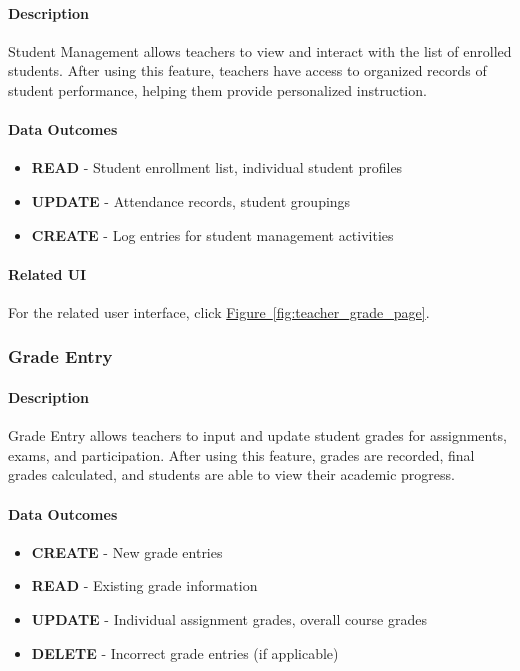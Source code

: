 \documentclass[12pt]{article}
\begin{document}
\paragraph{Description}
Student Management allows teachers to view and interact with the list of enrolled students. After using this feature, teachers have access to organized records of student performance, helping them provide personalized instruction.

\paragraph{Data Outcomes}
\begin{itemize}
    \item \textbf{READ} - Student enrollment list, individual student profiles
    \item \textbf{UPDATE} - Attendance records, student groupings
    \item \textbf{CREATE} - Log entries for student management activities
\end{itemize}

\paragraph{Related UI}
For the related user interface, click \hyperref[fig:teacher_grade_page]{Figure~\ref*{fig:teacher_grade_page}}.

\subsubsection{Grade Entry}

\paragraph{Description}
Grade Entry allows teachers to input and update student grades for assignments, exams, and participation. After using this feature, grades are recorded, final grades calculated, and students are able to view their academic progress.

\paragraph{Data Outcomes}
\begin{itemize}
    \item \textbf{CREATE} - New grade entries
    \item \textbf{READ} - Existing grade information
    \item \textbf{UPDATE} - Individual assignment grades, overall course grades
    \item \textbf{DELETE} - Incorrect grade entries (if applicable)
\end{itemize}
\end{document}
